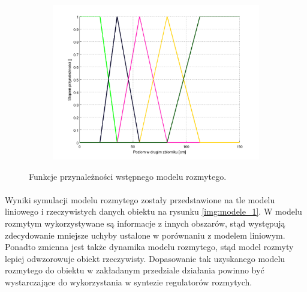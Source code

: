 \documentclass[a4paper,12pt]{article}
\begin{document}
\begin{figure}[h]
   \centering
   \begin{subfigure}[h]{0.45\textwidth}
      \includegraphics[width=\textwidth]{img/trapezoid_mfs.png}
   \end{subfigure}
   \caption{Funkcje przynależności wstępnego modelu rozmytego.}
   \label{img:trapezoid_mfs}
\end{figure}

\paragraph{}
Wyniki symulacji modelu rozmytego zostały przedstawione na tle modelu liniowego i rzeczywistych danych obiektu na rysunku \ref{img:modele_1}.
W modelu rozmytym wykorzystywane są informacje z innych obszarów, stąd występują zdecydowanie mniejsze uchyby ustalone w porównaniu z modelem liniowym.
Ponadto zmienna jest także dynamika modelu rozmytego, stąd model rozmyty lepiej odwzorowuje obiekt rzeczywisty.
Dopasowanie tak uzyskanego modelu rozmytego do obiektu w zakładanym przedziale działania powinno być wystarczające do wykorzystania w syntezie regulatorów rozmytych.
\end{document}
